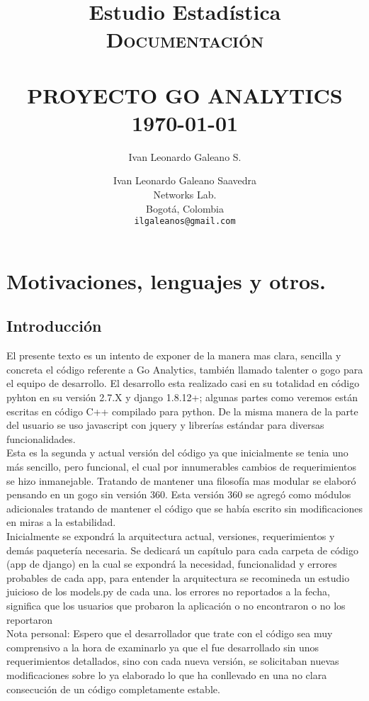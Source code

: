 \documentclass[10pt,a4paper]{book}
\author{Ivan Leonardo Galeano S.}
\title{Estudio Estadística}
\title{	\normalsize \textsc{Documentación}
	\\[2.0cm]
	\HRule{0.5pt} \\
	\LARGE \textbf{\uppercase{Proyecto Go Analytics}}
	\HRule{2pt} \\ [0.5cm]
	\normalsize \today
}
\author{
	Ivan Leonardo Galeano Saavedra\\
	Networks Lab.\\
	Bogotá, Colombia\\
	\texttt{ilgaleanos@gmail.com} \\
}
\makeatletter
\def\printtitle{
	{\centering \@title\par}}
\def\printauthor{
	{\centering \large \@author}}
\makeatother
\begin{document}
	\thispagestyle{empty}
	\printtitle
	\vfill
	\printauthor

	\tableofcontents

	\chapter{Motivaciones, lenguajes y otros.}

	\section*{Introducción}
	
	El presente texto es un intento de exponer de la manera mas clara, sencilla y concreta el código referente a Go Analytics, también llamado talenter o gogo para el equipo de desarrollo. El desarrollo esta realizado casi en su totalidad en código pyhton en su versión 2.7.X y django 1.8.12+; algunas partes como veremos están escritas en código C++ compilado para python. De la misma manera de la parte del usuario se uso javascript con jquery y librerías estándar para diversas funcionalidades.\\
	
	Esta es la segunda y actual versión del código ya que inicialmente se tenia uno más sencillo, pero funcional, el cual por innumerables cambios de requerimientos se hizo inmanejable. Tratando de mantener una filosofía mas modular se elaboró pensando en un gogo sin versión 360. Esta versión 360 se agregó como módulos adicionales tratando de mantener el código que se había escrito sin modificaciones en miras a la estabilidad.\\
	
	Inicialmente se expondrá la arquitectura actual, versiones, requerimientos y demás paquetería necesaria. Se dedicará un capítulo para cada carpeta de código (app de django) en la cual se expondrá la necesidad, funcionalidad y errores probables de cada app, para entender la arquitectura se recomineda un estudio juicioso de los models.py de cada una. los errores no reportados a la fecha, significa que los usuarios que probaron la aplicación o no encontraron o no los reportaron\\
	
	Nota personal: Espero que el desarrollador que trate con el código sea muy comprensivo a la hora de examinarlo ya que el fue desarrollado sin unos requerimientos detallados, sino con cada nueva versión, se solicitaban nuevas modificaciones sobre lo ya elaborado lo que ha conllevado en una no clara consecución de un código completamente estable.\\
	
\end{document}
